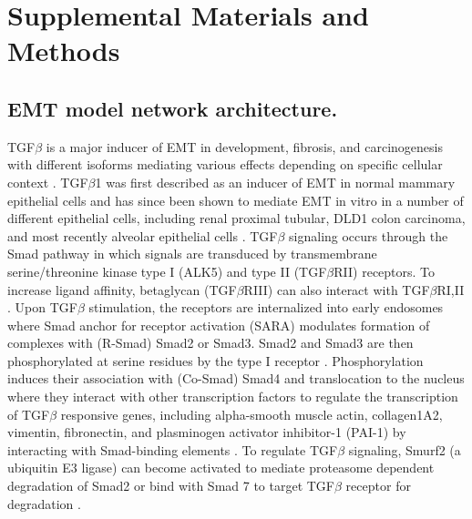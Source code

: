 \section*{Supplemental Materials and Methods}
\subsection*{EMT model network architecture.} TGF$\beta$ is a major inducer of EMT in development, fibrosis, and carcinogenesis with different isoforms mediating various effects depending on specific cellular context \cite{Nawshad:2005pi}.
TGF$\beta$1 was first described as an inducer of EMT in normal mammary epithelial cells \cite{Miettinen1994} and has since been shown to mediate EMT in vitro in a number of different epithelial cells, including renal proximal tubular, DLD1 colon carcinoma, and most recently alveolar epithelial cells \cite{Fan1999, Hales1994,Kasai2005,Willis2005}.
TGF$\beta$ signaling occurs through the Smad pathway in which signals are transduced by transmembrane serine/threonine kinase type I (ALK5) and type II (TGF$\beta$RII) receptors.
To increase ligand affinity, betaglycan (TGF$\beta$RIII) can also interact with TGF$\beta$RI,II \cite{Gatza:2010if}.
Upon TGF$\beta$ stimulation, the receptors are internalized into early endosomes where Smad anchor for receptor activation (SARA) modulates formation of complexes with (R-Smad) Smad2 or Smad3.
Smad2 and Smad3 are then phosphorylated at serine residues by the type I receptor \cite{Massague:2005qc}.
Phosphorylation induces their association with (Co-Smad) Smad4 and translocation to the nucleus where they interact with other transcription factors to regulate the transcription of TGF$\beta$ responsive genes, including alpha-smooth muscle actin, collagen1A2, vimentin, fibronectin, and plasminogen activator inhibitor-1 (PAI-1) by interacting with Smad-binding elements \cite{Dennler:2002hl,Derynck:2003fc}.
To regulate TGF$\beta$ signaling, Smurf2 (a ubiquitin E3 ligase) can become activated to mediate proteasome dependent degradation of Smad2 or bind with Smad 7 to target TGF$\beta$ receptor for degradation \cite{Kavsak2000,Bonni2001}.

